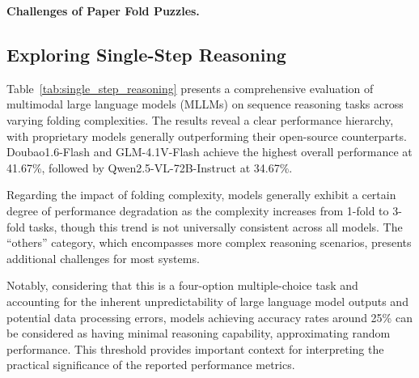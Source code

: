 \documentclass[letterpaper]{article} %
\begin{document}
\noindent \textbf{Challenges of Paper Fold Puzzles.}

\subsection{Exploring Single-Step Reasoning}

Table~\ref{tab:single_step_reasoning} presents a comprehensive evaluation of multimodal large language models (MLLMs) on sequence reasoning tasks across varying folding complexities. The results reveal a clear performance hierarchy, with proprietary models generally outperforming their open-source counterparts. Doubao1.6-Flash and GLM-4.1V-Flash achieve the highest overall performance at 41.67\%, followed by Qwen2.5-VL-72B-Instruct at 34.67\%.

Regarding the impact of folding complexity, models generally exhibit a certain degree of performance degradation as the complexity increases from 1-fold to 3-fold tasks, though this trend is not universally consistent across all models. The ``others'' category, which encompasses more complex reasoning scenarios, presents additional challenges for most systems.

Notably, considering that this is a four-option multiple-choice task and accounting for the inherent unpredictability of large language model outputs and potential data processing errors, models achieving accuracy rates around 25\% can be considered as having minimal reasoning capability, approximating random performance. This threshold provides important context for interpreting the practical significance of the reported performance metrics.
\end{document}
